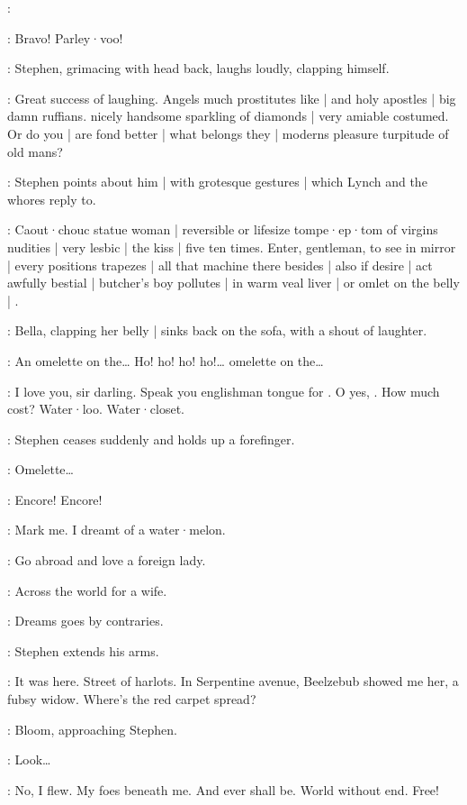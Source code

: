 \Lynch:

\Whores:
Bravo!
Parley·voo!

:
Stephen,
grimacing with head back,
laughs loudly,
clapping himself.

\Stephen:
Great success of laughing.
Angels much prostitutes like |
and holy apostles |
big damn ruffians.
 nicely handsome sparkling of diamonds |
very amiable costumed.
Or do you |
are fond better |
what belongs they |
moderns pleasure turpitude of old mans?

:
Stephen points about him |
with grotesque gestures |
which Lynch and the whores reply to.

\Stephen:
Caout·chouc statue woman |
reversible or lifesize tompe·ep·tom of virgins nudities |
very lesbic |
the kiss |
five ten times.
Enter,
gentleman,
to see in mirror |
every positions trapezes |
all that machine there besides |
also if desire |
act awfully bestial |
butcher's boy pollutes |
in warm veal liver |
or omlet on the belly |
.

:
Bella,
clapping her belly |
sinks back on the sofa,
with a shout of laughter.

\Bella:
An omelette on the…
Ho!
ho!
ho!
ho!…
omelette on the…

\Stephen:
I love you,
sir darling.
Speak you englishman tongue for .
O yes,
.
How much cost?
Water·loo.
Water·closet.

:
Stephen ceases suddenly and holds up a forefinger.

\Bella:
Omelette…

\Whores:
Encore!
Encore!

\Stephen:
Mark me.
I dreamt of a water·melon.

\Zoe:
Go abroad and love a foreign lady.

\Lynch:
Across the world for a wife.

\Florry:
Dreams goes by contraries.

:
Stephen extends his arms.

\Stephen:
It was here.
Street of harlots.
In Serpentine avenue,
Beelzebub showed me her,
a fubsy widow.
Where's the red carpet spread?

:
Bloom,
approaching Stephen.

\Bloom:
Look…

\Stephen:
No,
I flew.
My foes beneath me.
And ever shall be.
World without end.
Free!

